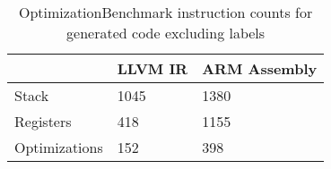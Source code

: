 \begin{table}[h!]
\centering
\begin{tabular}{p{}p{}p{}}
  \hline
 & LLVM IR & ARM Assembly \\ 
  \hline
Stack & 1045 & 1380 \\ 
  Registers & 418 & 1155 \\ 
  Optimizations & 152 & 398 \\ 
   \hline
\end{tabular}
\caption{OptimizationBenchmark instruction counts for generated code excluding labels}
\end{table}
